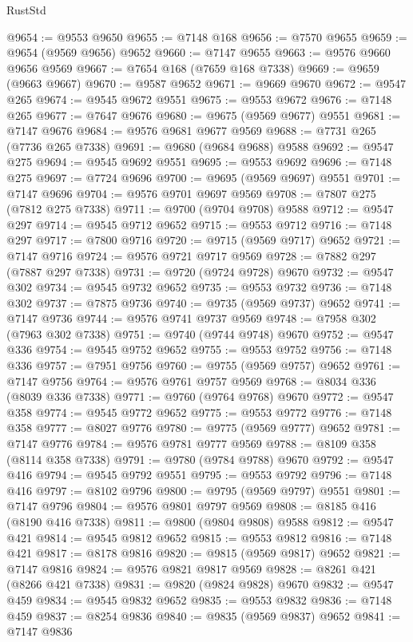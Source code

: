 \begin{lexlean}{RustStd}
\begin{coremodule}
@9654 := @9553 @9650
@9655 := @7148 @168
@9656 := @7570 @9655
@9659 := @9654 (@9569 @9656) @9652
@9660 := @7147 @9655
@9663 := @9576 @9660 @9656 @9569
@9667 := @7654 @168 (@7659 @168 @7338)
@9669 := @9659 (@9663 @9667)
@9670 := @9587 @9652
@9671 := @9669 @9670
@9672 := @9547 @265
@9674 := @9545 @9672 @9551
@9675 := @9553 @9672
@9676 := @7148 @265
@9677 := @7647 @9676
@9680 := @9675 (@9569 @9677) @9551
@9681 := @7147 @9676
@9684 := @9576 @9681 @9677 @9569
@9688 := @7731 @265 (@7736 @265 @7338)
@9691 := @9680 (@9684 @9688) @9588
@9692 := @9547 @275
@9694 := @9545 @9692 @9551
@9695 := @9553 @9692
@9696 := @7148 @275
@9697 := @7724 @9696
@9700 := @9695 (@9569 @9697) @9551
@9701 := @7147 @9696
@9704 := @9576 @9701 @9697 @9569
@9708 := @7807 @275 (@7812 @275 @7338)
@9711 := @9700 (@9704 @9708) @9588
@9712 := @9547 @297
@9714 := @9545 @9712 @9652
@9715 := @9553 @9712
@9716 := @7148 @297
@9717 := @7800 @9716
@9720 := @9715 (@9569 @9717) @9652
@9721 := @7147 @9716
@9724 := @9576 @9721 @9717 @9569
@9728 := @7882 @297 (@7887 @297 @7338)
@9731 := @9720 (@9724 @9728) @9670
@9732 := @9547 @302
@9734 := @9545 @9732 @9652
@9735 := @9553 @9732
@9736 := @7148 @302
@9737 := @7875 @9736
@9740 := @9735 (@9569 @9737) @9652
@9741 := @7147 @9736
@9744 := @9576 @9741 @9737 @9569
@9748 := @7958 @302 (@7963 @302 @7338)
@9751 := @9740 (@9744 @9748) @9670
@9752 := @9547 @336
@9754 := @9545 @9752 @9652
@9755 := @9553 @9752
@9756 := @7148 @336
@9757 := @7951 @9756
@9760 := @9755 (@9569 @9757) @9652
@9761 := @7147 @9756
@9764 := @9576 @9761 @9757 @9569
@9768 := @8034 @336 (@8039 @336 @7338)
@9771 := @9760 (@9764 @9768) @9670
@9772 := @9547 @358
@9774 := @9545 @9772 @9652
@9775 := @9553 @9772
@9776 := @7148 @358
@9777 := @8027 @9776
@9780 := @9775 (@9569 @9777) @9652
@9781 := @7147 @9776
@9784 := @9576 @9781 @9777 @9569
@9788 := @8109 @358 (@8114 @358 @7338)
@9791 := @9780 (@9784 @9788) @9670
@9792 := @9547 @416
@9794 := @9545 @9792 @9551
@9795 := @9553 @9792
@9796 := @7148 @416
@9797 := @8102 @9796
@9800 := @9795 (@9569 @9797) @9551
@9801 := @7147 @9796
@9804 := @9576 @9801 @9797 @9569
@9808 := @8185 @416 (@8190 @416 @7338)
@9811 := @9800 (@9804 @9808) @9588
@9812 := @9547 @421
@9814 := @9545 @9812 @9652
@9815 := @9553 @9812
@9816 := @7148 @421
@9817 := @8178 @9816
@9820 := @9815 (@9569 @9817) @9652
@9821 := @7147 @9816
@9824 := @9576 @9821 @9817 @9569
@9828 := @8261 @421 (@8266 @421 @7338)
@9831 := @9820 (@9824 @9828) @9670
@9832 := @9547 @459
@9834 := @9545 @9832 @9652
@9835 := @9553 @9832
@9836 := @7148 @459
@9837 := @8254 @9836
@9840 := @9835 (@9569 @9837) @9652
@9841 := @7147 @9836

\end{coremodule}
\end{lexlean}
